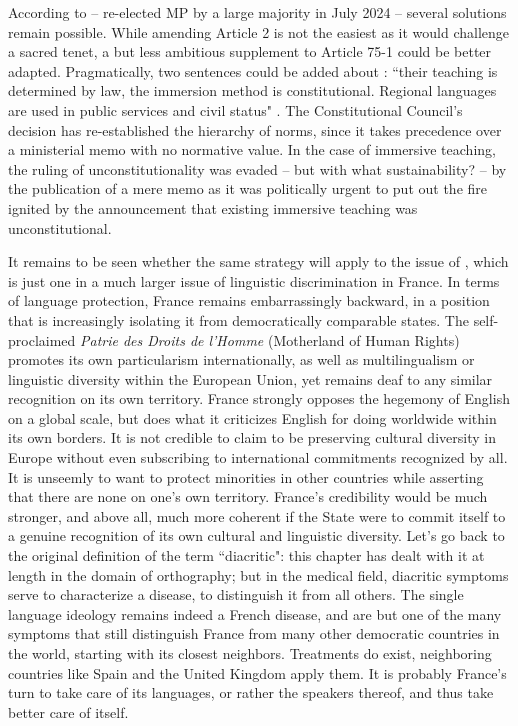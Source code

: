 \documentclass[output=paper,colorlinks,citecolor=brown]{langscibook}
\begin{document}
According to  – re-elected MP by a large majority in July 2024 – several solutions remain possible. While amending Article 2 is not the easiest as it would challenge a sacred tenet, a but less ambitious supplement to Article 75-1 could be better adapted. Pragmatically, two sentences could be added about : ``their teaching is determined by law, the immersion method is constitutional. Regional languages are used in public services and civil status" \citep{sm:Molac2022}. The Constitutional Council's decision has re-established the hierarchy of norms, since it takes precedence over a ministerial memo with no normative value. In the case of immersive teaching, the ruling of unconstitutionality was evaded – but with what sustainability? – by the publication of a mere memo \citep{sm:BOEMJS2021} as it was politically urgent to put out the fire ignited by the announcement that existing immersive teaching was unconstitutional. 

It remains to be seen whether the same strategy will apply to the issue of , which is just one in a much larger issue of linguistic discrimination in France. In terms of language protection, France remains embarrassingly backward, in a position that is increasingly isolating it from democratically comparable states. The self-proclaimed \textit{Patrie des Droits de l'Homme} (Motherland of Human Rights) promotes its own particularism internationally, as well as multilingualism or linguistic diversity within the European Union, yet remains deaf to any similar recognition on its own territory. France strongly opposes the hegemony of English on a global scale, but does what it criticizes English for doing worldwide within its own borders. It is not credible to claim to be preserving cultural diversity in Europe without even subscribing to international commitments recognized by all. It is unseemly to want to protect minorities in other countries while asserting that there are none on one’s own territory. France’s credibility would be much stronger, and above all, much more coherent if the State were to commit itself to a genuine recognition of its own cultural and linguistic diversity. Let's go back to the original definition of the term ``diacritic": this chapter has dealt with it at length in the domain of orthography; but in the medical field, diacritic symptoms serve to characterize a disease, to distinguish it from all others. The single language ideology remains indeed a French disease, and  are but one of the many symptoms that still distinguish France from many other democratic countries in the world, starting with its closest neighbors. Treatments do exist, neighboring countries like Spain and the United Kingdom apply them. It is probably France's turn to take care of its languages, or rather the speakers thereof, and thus take better care of itself.
\end{document}
